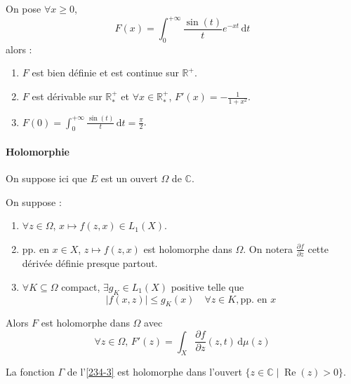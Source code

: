 
	\begin{application}
		On pose $\forall x \geq 0$,
		\[ F(x) = \int_0^{+\infty} \frac{\sin(t)}{t} e^{-xt} \, \mathrm{d}t \]
		alors :
		\begin{enumerate}[label=(\roman*)]
			\item $F$ est bien définie et est continue sur $\mathbb{R}^+$.
			\item $F$ est dérivable sur $\mathbb{R}^+_*$ et $\forall x \in \mathbb{R}^+_*$, $F'(x) = -\frac{1}{1+x^2}$.
			\item $F(0) = \int_0^{+\infty} \frac{\sin(t)}{t} \, \mathrm{d}t = \frac{\pi}{2}$.
		\end{enumerate}
	\end{application}

	\paragraph{Holomorphie}


	On suppose ici que $E$ est un ouvert $\Omega$ de $\mathbb{C}$.

	\begin{theorem}
		On suppose :
		\begin{enumerate}[label=(\roman*)]
			\item $\forall z \in \Omega$, $x \mapsto f(z,x) \in L_1(X)$.
			\item pp. en $x \in X$, $z \mapsto f(z,x)$ est holomorphe dans $\Omega$. On notera $\frac{\partial f}{\partial z}$ cette dérivée définie presque partout.
			\item $\forall K \subseteq \Omega$ compact, $\exists g_K \in L_1(X)$ positive telle que
			\[ \left| f(x,z) \right| \leq g_K(x) \quad \forall z \in K, \text{pp. en } x \]
		\end{enumerate}
		Alors $F$ est holomorphe dans $\Omega$ avec
		\[ \forall z \in \Omega, \, F'(z) = \int_X \frac{\partial f}{\partial z}(z, t) \, \mathrm{d}\mu(z) \]
	\end{theorem}


	\begin{example}
		La fonction $\Gamma$ de l'\cref{234-3} est holomorphe dans l'ouvert $\{ z \in \mathbb{C} \mid \operatorname{Re}(z) > 0 \}$.
	\end{example}

